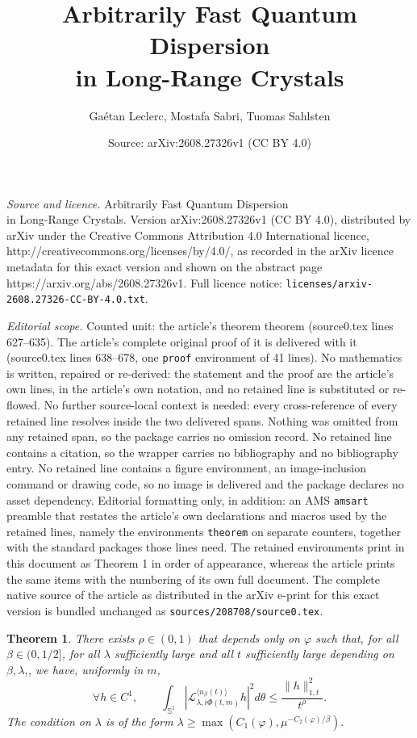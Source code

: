 \documentclass[10pt,a4paper]{amsart}
\title{Arbitrarily Fast Quantum Dispersion \\ in Long-Range Crystals}
\author{Ga\'etan Leclerc, Mostafa Sabri, Tuomas Sahlsten}
\date{Source: arXiv:2608.27326v1 (CC BY 4.0)}
\newtheorem{theorem}{Theorem}
\begin{document}
\maketitle

\noindent\emph{Source and licence.} Arbitrarily Fast Quantum Dispersion \\ in Long-Range Crystals. Version arXiv:2608.27326v1 (CC BY 4.0), distributed by arXiv under the Creative Commons Attribution 4.0 International licence, http://creativecommons.org/licenses/by/4.0/, as recorded in the arXiv licence metadata for this exact version and shown on the abstract page https://arxiv.org/abs/2608.27326v1. Full licence notice: \texttt{licenses/arxiv-2608.27326-CC-BY-4.0.txt}.\par\smallskip

\noindent\textit{Editorial scope.} Counted unit: the article's theorem theorem (source0.tex lines 627--635). The article's complete original proof of it is delivered with it (source0.tex lines 638--678, one \texttt{proof} environment of 41 lines). No mathematics is written, repaired or re-derived: the statement and the proof are the article's own lines, in the article's own notation, and no retained line is substituted or re-flowed.  No further source-local context is needed: every cross-reference of every retained line resolves inside the two delivered spans.  Nothing was omitted from any retained span, so the package carries no omission record.  No retained line contains a citation, so the wrapper carries no bibliography and no bibliography entry.  No retained line contains a figure environment, an image-inclusion command or drawing code, so no image is delivered and the package declares no asset dependency.  Editorial formatting only, in addition: an AMS \texttt{amsart} preamble that restates the article's own declarations and macros used by the retained lines, namely the environments \texttt{theorem} on separate counters, together with the standard packages those lines need.  The retained environments print in this document as Theorem 1 in order of appearance, whereas the article prints the same items with the numbering of its own full document.  The complete native source of the article as distributed in the arXiv e-print for this exact version is bundled unchanged as \texttt{sources/208708/source0.tex}.
\begin{theorem}
There exists $\rho \in (0,1)$ that depends only on $\varphi$ such that, for all $\beta \in (0,1/2]$, for all $\lambda$ sufficiently large and all $t$ sufficiently large depending on $\beta,\lambda$,, we have, uniformly in $m$,
$$
\forall h \in C^1, \qquad
\int_{\mathbb{S}^1} |\mathcal{L}_{\lambda,i\Phi(t,m)}^{\langle n_\beta(t) \rangle} h|^2 d\theta
\leq \frac{\|h\|_{1,t}^2}{t^{\rho}}.
$$
The condition on $\lambda$ is of the form $\lambda \geq \max(C_1(\varphi),\mu^{-C_2(\varphi)/\beta}).$
\end{theorem}
\end{document}
